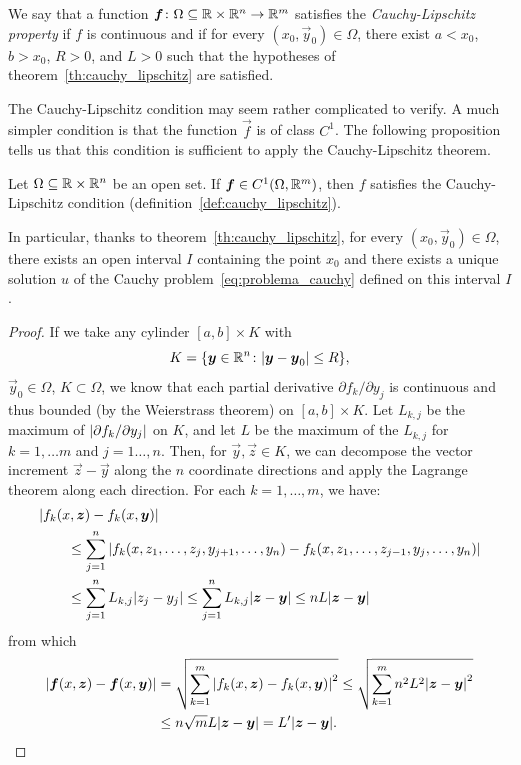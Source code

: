 \begin{definition}%
\label{def:cauchy_lipschitz}%
We say that a function $\boldsymbol f\colon \Omega\subseteq {\mathbb R}\times {\mathbb R}^n \to {\mathbb R}^m$
satisfies the \emph{Cauchy-Lipschitz property}%
 if $f$ is continuous and if for every $(x_0,\vec y_0)\in \Omega$, there exist $a<x_0$, $b>x_0$, $R>0$, and $L>0$ such that the hypotheses of theorem~\ref{th:cauchy_lipschitz} are satisfied.
\end{definition}
 
The Cauchy-Lipschitz condition may seem rather complicated to verify. A much
simpler condition is that the function $\vec f$ is of class $C^1$. The following
proposition tells us that this condition is sufficient to apply the
Cauchy-Lipschitz theorem.

\begin{proposition}%
\mymark{***}%
Let $\Omega \subseteq {\mathbb R}\times {\mathbb R}^n$ be an open set. If $\boldsymbol f\in
C^1(\Omega,{\mathbb R}^m)$, then $f$ satisfies the Cauchy-Lipschitz condition
(definition~\ref{def:cauchy_lipschitz}).

In particular, thanks to theorem~\ref{th:cauchy_lipschitz}, for every $(x_0,\vec
y_0)\in \Omega$, there exists an open interval $I$ containing the point $x_0$
and there exists a unique solution $u$ of the Cauchy
problem~\eqref{eq:problema_cauchy} defined on this interval $I$.
\end{proposition}
%
\begin{proof}
\mymark{***}%
If we take any cylinder $[a,b]\times K$ with 
\[
  K={\left\{ \boldsymbol y\in {\mathbb R}^n\colon {\left|\boldsymbol y-\boldsymbol y_0\right|}\le R \right\}}, 
\]
$\vec y_0\in \Omega$, $K\subset \Omega$, we know that each partial derivative
$\partial f_k / \partial y_j$ is continuous and thus bounded (by the Weierstrass
theorem) on $[a,b]\times K$. Let $L_{k,j}$ be the maximum of ${\left|\partial f_k
/ \partial y_j\right|}$ on $K$, and let $L$ be the maximum of the $L_{k,j}$ for
$k=1,\dots m$ and $j=1\dots,n$. Then, for $\vec y, \vec z\in K$, we can
decompose the vector increment $\vec z - \vec y$ along the $n$ coordinate
directions and apply the Lagrange theorem along each direction. For each $k =
1,\dots, m$, we have:
\begin{align*}
\MoveEqLeft
\abs{f_k(x,\vec z)-f_k(x,\vec y)}\\
&\le \sum_{j=1}^n \abs{f_k(x,z_1, \dots, z_j, y_{j+1}, \dots, y_n) - f_k(x,z_1,
\dots, z_{j-1}, y_j, \dots, y_n)}\\
&\le \sum_{j=1}^n L_{k,j} \abs{z_j-y_j}
\le \sum_{j=1}^n L_{k,j} \abs{\vec z-\vec y}
\le n L \abs{\vec z-\vec y}
\end{align*}
from which
\begin{align*}
  {\left|\boldsymbol f(x,\boldsymbol z) - \boldsymbol f(x,\boldsymbol y)\right|}
  &= \sqrt{\sum_{k=1}^m {\left|f_k(x,\boldsymbol z) - f_k(x,\boldsymbol y)\right|}^2} 
  \le \sqrt{\sum_{k=1}^m n^2 L^2 {\left|\boldsymbol z-\boldsymbol y\right|}^2} \\
  &\le n\sqrt{m} L {\left|\boldsymbol z-\boldsymbol y\right|} = L' {\left|\boldsymbol z-\boldsymbol y\right|}.
\end{align*}
\end{proof}


